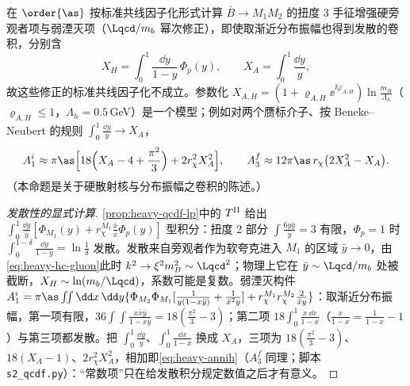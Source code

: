 \begin{proposition}\label{prop:heavy-qcdf-endpoint}
在 $\order{\as}$ 按标准共线因子化形式计算 $\bar B\to M_1M_2$ 的扭度 3 手征增强硬旁观者项与弱湮灭项（$\Lqcd/m_b$ 幂次修正），即使取渐近分布振幅也得到发散的卷积，分别含
\begin{equation}\label{eq:heavy-XAXH}
X_H=\int_0^1\frac{\dd y}{1-y}\,\Phi_p(y),\qquad X_A=\int_0^1\frac{\dd y}{y},
\end{equation}
故这些修正的标准共线因子化不成立。参数化 $X_{A,H}=(1+\varrho_{A,H}\ee^{\ii\varphi_{A,H}})\ln\frac{m_B}{\Lambda_h}$（$\varrho_{A,H}\le1$，$\Lambda_h=0.5$\,GeV）是一个模型；例如对两个赝标介子、按 Beneke--Neubert 的规则 $\int_0^1\frac{\dd y}{y}\to X_A$，
\begin{equation}\label{eq:heavy-annih}
A_1^i\approx\pi\as\Big[18\Big(X_A-4+\frac{\pi^2}{3}\Big)+2r_\chi^2X_A^2\Big],\qquad A_3^f\approx12\pi\as\,r_\chi\big(2X_A^2-X_A\big).
\end{equation}
（本命题是关于硬散射核与分布振幅之卷积的陈述。）
\end{proposition}

\begin{proof}[发散性的显式计算]
\cref{prop:heavy-qcdf-lp}中的 $T^{\rm II}$ 给出 $\int_0^1\frac{\dd y}{\bar y}[\Phi_{M_1}(y)+r_\chi^{M_1}\frac{\bar x}{x}\Phi_p(y)]$ 型积分\cite[式~(57)]{BenekeEtAl2001}：扭度 2 部分 $\int\frac{6y\bar y}{\bar y}=3$ 有限，$\Phi_p=1$ 时 $\int_0^{1-\delta}\frac{\dd y}{1-y}=\ln\frac1\delta$ 发散。发散来自旁观者作为软夸克进入 $M_1$ 的区域 $\bar y\to0$，由\cref{eq:heavy-hc-gluon}此时 $k^2\to\xi^2m_B^2\sim\Lqcd^2$；物理上它在 $\bar y\sim\Lqcd/m_b$ 处被截断，$X_H\sim\ln(m_b/\Lqcd)$，系数可能是复数\cite{BenekeEtAl2001}。弱湮灭构件 $A_1^i=\pi\as\int\!\!\int\dd x\,\dd y\{\Phi_{M_2}\Phi_{M_1}[\frac{1}{y(1-x\bar y)}+\frac{1}{\bar x^2y}]+r_\chi^{M_1}r_\chi^{M_2}\frac{2}{\bar xy}\}$\cite[式~(62)]{BenekeEtAl2001}：取渐近分布振幅，第一项有限，$36\int\!\!\int\frac{x\bar x\bar y}{1-x\bar y}=18(\frac{\pi^2}{3}-3)$；第二项 $18\int_0^1\frac{x\,\dd x}{1-x}$（$\frac{x}{1-x}=\frac1{1-x}-1$）与第三项都发散。把 $\int_0^1\frac{\dd y}{y}$、$\int_0^1\frac{\dd x}{1-x}$ 换成 $X_A$，三项为 $18(\frac{\pi^2}{3}-3)$、$18(X_A-1)$、$2r_\chi^2X_A^2$，相加即\cref{eq:heavy-annih}（$A_3^f$ 同理；脚本 \texttt{s2\_\allowbreak qcdf.py}）：“常数项”只在给发散积分规定数值之后才有意义。
\end{proof}


